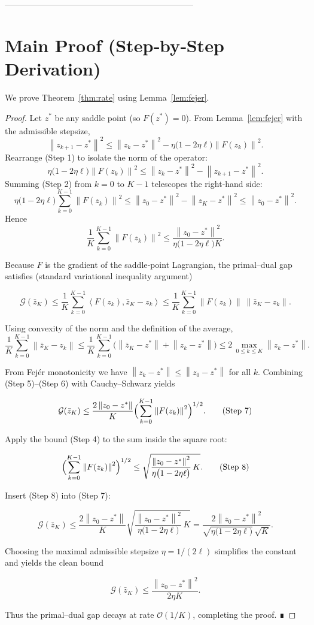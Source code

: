 \documentclass{article}
\newcommand{\norm}[1]{\left\lVert #1\right\rVert}
\newcommand{\inner}[2]{\left\langle #1,#2\right\rangle}
\newcommand{\gap}{\mathcal{G}}
\begin{document}
--------------------------------------------------------------------
\section*{Main Proof (Step‑by‑Step Derivation)}
We prove Theorem~\ref{thm:rate} using Lemma~\ref{lem:fejer}.

\begin{proof}
Let \(z^{*}\) be any saddle point (so \(F(z^{*})=0\)).  
From Lemma~\ref{lem:fejer} with the admissible stepsize,
\[
\norm{z_{k+1}-z^{*}}^{2}
\le \norm{z_{k}-z^{*}}^{2}
-\eta\bigl(1-2\eta\ell\bigr)\norm{F(z_{k})}^{2}.
\tag{Step 1}
\]
Rearrange (Step 1) to isolate the norm of the operator:
\[
\eta\bigl(1-2\eta\ell\bigr)\norm{F(z_{k})}^{2}
\le \norm{z_{k}-z^{*}}^{2}-\norm{z_{k+1}-z^{*}}^{2}.
\tag{Step 2}
\]
Summing (Step 2) from \(k=0\) to \(K-1\) telescopes the right‑hand side:
\[
\eta\bigl(1-2\eta\ell\bigr)\sum_{k=0}^{K-1}\norm{F(z_{k})}^{2}
\le \norm{z_{0}-z^{*}}^{2}-\norm{z_{K}-z^{*}}^{2}
\le \norm{z_{0}-z^{*}}^{2}.
\tag{Step 3}
\]
Hence
\[
\frac{1}{K}\sum_{k=0}^{K-1}\norm{F(z_{k})}^{2}
\le \frac{\norm{z_{0}-z^{*}}^{2}}{\eta\bigl(1-2\eta\ell\bigr)K}.
\tag{Step 4}
\]

Because \(F\) is the gradient of the saddle‑point Lagrangian,
the primal–dual gap satisfies (standard variational inequality argument)

\[
\gap(\bar z_{K})
\le \frac{1}{K}\sum_{k=0}^{K-1}\inner{F(z_{k})}{\bar z_{K}-z_{k}}
\le \frac{1}{K}\sum_{k=0}^{K-1}\norm{F(z_{k})}\,\norm{\bar z_{K}-z_{k}}.
\tag{Step 5}
\]

Using convexity of the norm and the definition of the average,
\[
\frac{1}{K}\sum_{k=0}^{K-1}\norm{\bar z_{K}-z_{k}}
\le \frac{1}{K}\sum_{k=0}^{K-1}\bigl(\norm{\bar z_{K}-z^{*}}+\norm{z_{k}-z^{*}}\bigr)
\le 2\,\max_{0\le k\le K}\norm{z_{k}-z^{*}}.
\tag{Step 6}
\]

From Fejér monotonicity we have \(\norm{z_{k}-z^{*}}\le \norm{z_{0}-z^{*}}\) for all
\(k\).  Combining (Step 5)–(Step 6) with Cauchy–Schwarz yields

\[
\gap(\bar z_{K})
\le \frac{2\norm{z_{0}-z^{*}}}{K}
\Bigl(\sum_{k=0}^{K-1}\norm{F(z_{k})}^{2}\Bigr)^{1/2}.
\tag{Step 7}
\]

Apply the bound (Step 4) to the sum inside the square root:

\[
\Bigl(\sum_{k=0}^{K-1}\norm{F(z_{k})}^{2}\Bigr)^{1/2}
\le \sqrt{\frac{\norm{z_{0}-z^{*}}^{2}}{\eta\bigl(1-2\eta\ell\bigr)}\,K }.
\tag{Step 8}
\]

Insert (Step 8) into (Step 7):

\[
\gap(\bar z_{K})
\le
\frac{2\norm{z_{0}-z^{*}}}{K}
\sqrt{\frac{\norm{z_{0}-z^{*}}^{2}}{\eta\bigl(1-2\eta\ell\bigr)}\,K}
=
\frac{2\norm{z_{0}-z^{*}}^{2}}{\sqrt{\eta\bigl(1-2\eta\ell\bigr)}\,\sqrt{K}}.
\tag{Step 9}
\]

Choosing the maximal admissible stepsize \(\eta=1/(2\ell)\) simplifies the
constant and yields the clean bound

\[
\gap(\bar z_{K})\le \frac{\norm{z_{0}-z^{*}}^{2}}{2\eta K}.
\tag{Step 10}
\]

Thus the primal–dual gap decays at rate \(\mathcal{O}(1/K)\), completing the
proof. ∎
\end{proof}
\end{document}
